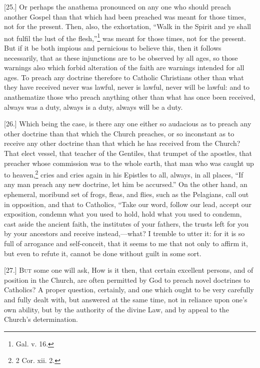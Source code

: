 [25.] Or perhaps the anathema pronounced on any one who should preach another Gospel than that which had been preached was meant for those times, not for the present. Then, also, the exhortation, “Walk in the Spirit and ye shall not fulfil the lust of the flesh,”\footnote{Gal. v. 16.} was meant for those times, not for the present. But if it be both impious and pernicious to believe this, then it follows necessarily, that as these injunctions are to be observed by all ages, so those warnings also which forbid alteration of the faith are warnings intended for all ages. To preach any doctrine therefore to Catholic Christians other than what they have received never was lawful, never is lawful, never will be lawful: and to anathematize those who preach anything other than what has once been received, always was a duty, always is a duty, always will be a duty.

[26.] Which being the case, is there any one either so audacious as to preach any other doctrine than that which the Church preaches, or so inconstant as to receive any other doctrine than that which he has received from the Church? That elect vessel, that teacher of the Gentiles, that trumpet of the apostles, that preacher whose commission was to the whole earth, that man who was caught up to heaven,\footnote{2 Cor. xii. 2.} cries and cries again in his Epistles to all, always, in all places, “If any man preach any new doctrine, let him be accursed.” On the other hand, an ephemeral, moribund set of frogs, fleas, and flies, such as the Pelagians, call out in opposition, and that to Catholics, “Take our word, follow our lead, accept our exposition, condemn what you used to hold, hold what you used to condemn, cast aside the ancient faith, the institutes of your fathers, the trusts left for you by your ancestors and receive instead,—what? I tremble to utter it: for it is so full of arrogance and self-conceit, that it seems to me that not only to affirm it, but even to refute it, cannot be done without guilt in some sort.


[27.] \textsc{But} some one will ask, How is it then, that certain excellent persons, and of position in the Church, are often permitted by God to preach novel doctrines to Catholics? A proper question, certainly, and one which ought to be very carefully and fully dealt with, but answered at the same time, not in reliance upon one’s own ability, but by the authority of the divine Law, and by appeal to the Church’s determination.

